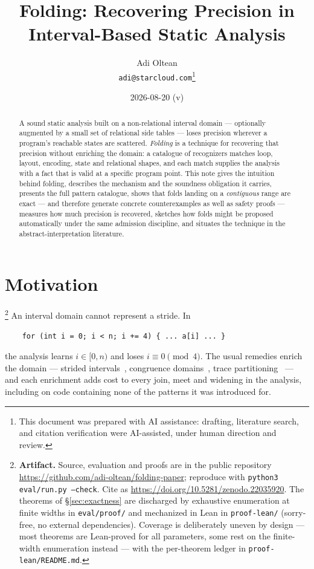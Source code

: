 \documentclass[11pt,a4paper]{article}
\title{Folding: Recovering Precision in Interval-Based Static Analysis}
\author{Adi Oltean \\ \texttt{adi@starcloud.com}\thanks{This document was prepared with
AI assistance: drafting, literature search, and citation verification were AI-assisted,
under human direction and review.}}
\date{2026-08-20 \quad (v\paperversion)}
\begin{document}
\maketitle

\begin{abstract}
\noindent
A sound static analysis built on a non-relational interval domain --- optionally
augmented by a small set of relational side tables --- loses precision wherever a
program's reachable states are scattered. \emph{Folding} is a technique for recovering
that precision without enriching the domain: a catalogue of recognizers matches loop,
layout, encoding, state and relational shapes, and each match supplies the analysis with
a fact that is valid at a specific program point. This note gives the intuition behind
folding, describes the mechanism and the soundness obligation it carries, presents the
full pattern catalogue, shows that folds landing on a \emph{contiguous} range are exact
--- and therefore generate concrete counterexamples as well as safety proofs --- measures
how much precision is recovered, sketches how folds might be proposed automatically
under the same admission discipline, and situates the technique in the
abstract-interpretation literature.
\end{abstract}

\section{Motivation}\footnote{\textbf{Artifact.} Source, evaluation and proofs are in
the public repository \url{https://github.com/adi-oltean/folding-paper}; reproduce with
\texttt{python3 eval/run.py --check}. Cite as
\url{https://doi.org/10.5281/zenodo.22035920}. The theorems of \S\ref{sec:exactness} are
discharged by exhaustive enumeration at finite widths in \texttt{eval/proof/} and
mechanized in Lean in \texttt{proof-lean/} (sorry-free, no external dependencies).
Coverage is deliberately uneven by design --- most theorems are Lean-proved for all
parameters, some rest on the finite-width enumeration instead --- with the per-theorem
ledger in \texttt{proof-lean/README.md}.}
An interval domain cannot represent a stride. In

\begin{verbatim}
    for (int i = 0; i < n; i += 4) { ... a[i] ... }
\end{verbatim}

\noindent
the analysis learns $i \in [0, n)$ and loses $i \equiv 0 \pmod 4$. The usual remedies
enrich the domain --- strided intervals~\cite{balakrishnan2010}, congruence
domains~\cite{granger1989}, trace partitioning~\cite{rival2007} --- and each enrichment
adds cost to every join, meet and widening in the analysis, including on code containing
none of the patterns it was introduced for.
\end{document}

